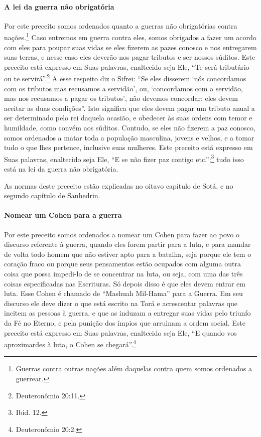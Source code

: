 \paragraph{A lei da guerra não obrigatória}

Por este preceito somos ordenados quanto a guerras não obrigatórias contra nações.\footnote{Guerras contra outras nações além daquelas contra quem somos
  ordenados a guerrear.} Caso entremos em guerra contra eles, somos obrigados
a fazer um acordo com eles para poupar suas vidas se eles fizerem as
pazes conosco e nos entregarem suas terras, e nesse caso eles deverão nos pagar
tributos e ser nossos súditos. Este preceito está expresso em Suas
palavras, enaltecido seja Ele, ``Te será tributário ou te servirá''.\footnote{Deuteronômio 20:11.} A esse respeito diz o Sifrei: ``Se eles disserem
`nós concordamos com os tributos mas recusamos a servidão', ou,
`concordamos com a servidão, mas nos recusamos a pagar os tributos', não
devemos concordar: eles devem aceitar as duas condições''. Isto
significa que eles devem pagar um tributo anual a ser determinado pelo
rei daquela ocasião, e obedecer às suas ordens com temor e humildade,
como convém aos súditos. Contudo, se eles não fizerem a paz conosco,
somos ordenados a matar toda a população masculina, jovens e velhos, e a
tomar tudo o que lhes pertence, inclusive suas mulheres. Este preceito
está expresso em Suas palavras, enaltecido seja Ele, ``E se não fizer
paz contigo etc.'';\footnote{Ibid. 12.} tudo isso está na lei da guerra não
obrigatória.

As normas deste preceito estão explicadas no oitavo capítulo de Sotá, e
no segundo capítulo de Sanhedrin.

\paragraph{Nomear um Cohen para a guerra}

Por este preceito somos ordenados a nomear um Cohen para fazer ao
povo o discurso referente à guerra, quando eles forem partir para a
luta, e para mandar de volta todo homem que não estiver apto para a batalha,
seja porque ele tem o coração fraco ou porque seus pensamentos estão
ocupados com alguma outra coisa que possa impedi-lo de se concentrar na
luta, ou seja, com uma das três coisas especificadas nas Escrituras. Só
depois disso é que eles devem entrar em luta. Esse Cohen é chamado
de ``Mashuah Mil-Hama'' para a Guerra. Em seu discurso ele deve dizer o
que está escrito na Torá e acrescentar palavras que incitem as pessoas
à guerra, e que as induzam a entregar suas vidas pelo triunfo da Fé no
Eterno, e pela punição dos ímpios que arruinam a ordem social. Este
preceito está expresso em Suas palavras, enaltecido seja Ele, ``E quando
vos aproximardes à luta, o Cohen se chegará''.\footnote{Deuteronômio 20:2.}


